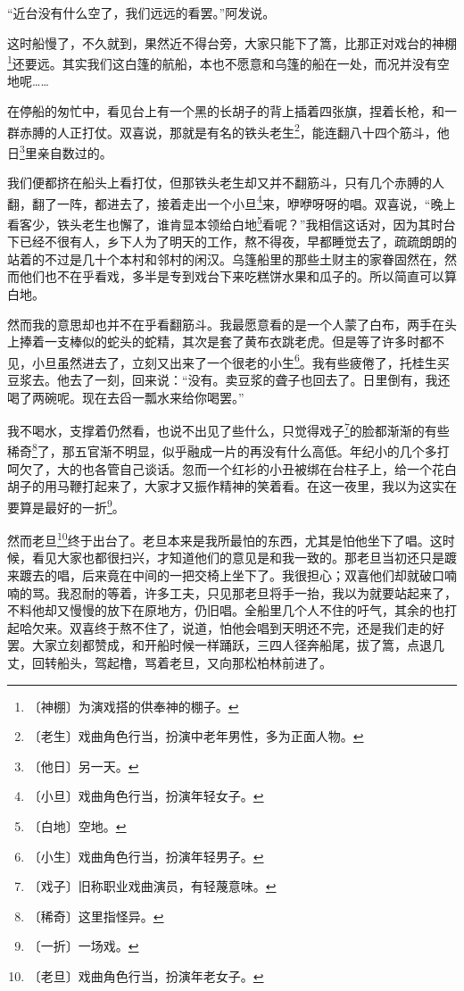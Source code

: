 \documentclass[12pt,UTF-8,openany]{ctexbook}
\begin{document}
\begin{large}
    “近台没有什么空了，我们远远的看罢。”阿发说。
    
    这时船慢了，不久就到，果然近不得台旁，大家只能下了篙，比那正对戏台的神棚\footnote{〔神棚〕为演戏搭的供奉神的棚子。}还要远。其实我们这白篷的航船，本也不愿意和乌篷的船在一处，而况并没有空地呢……
    
    在停船的匆忙中，看见台上有一个黑的长胡子的背上插着四张旗，捏着长枪，和一群赤膊的人正打仗。双喜说，那就是有名的铁头老生\footnote{〔老生〕戏曲角色行当，扮演中老年男性，多为正面人物。}，能连翻八十四个筋斗，他日\footnote{〔他日〕另一天。}里亲自数过的。
    
    我们便都挤在船头上看打仗，但那铁头老生却又并不翻筋斗，只有几个赤膊的人翻，翻了一阵，都进去了，接着走出一个小旦\footnote{〔小旦〕戏曲角色行当，扮演年轻女子。}来，咿咿呀呀的唱。双喜说，“晚上看客少，铁头老生也懈了，谁肯显本领给白地\footnote{〔白地〕空地。}看呢？”我相信这话对，因为其时台下已经不很有人，乡下人为了明天的工作，熬不得夜，早都睡觉去了，疏疏朗朗的站着的不过是几十个本村和邻村的闲汉。乌篷船里的那些土财主的家眷固然在，然而他们也不在乎看戏，多半是专到戏台下来吃糕饼水果和瓜子的。所以简直可以算白地。
    
    然而我的意思却也并不在乎看翻筋斗。我最愿意看的是一个人蒙了白布，两手在头上捧着一支棒似的蛇头的蛇精，其次是套了黄布衣跳老虎。但是等了许多时都不见，小旦虽然进去了，立刻又出来了一个很老的小生\footnote{〔小生〕戏曲角色行当，扮演年轻男子。}。我有些疲倦了，托桂生买豆浆去。他去了一刻，回来说：“没有。卖豆浆的聋子也回去了。日里倒有，我还喝了两碗呢。现在去舀一瓢水来给你喝罢。”
    
    我不喝水，支撑着仍然看，也说不出见了些什么，只觉得戏子\footnote{〔戏子〕旧称职业戏曲演员，有轻蔑意味。}的脸都渐渐的有些稀奇\footnote{〔稀奇〕这里指怪异。}了，那五官渐不明显，似乎融成一片的再没有什么高低。年纪小的几个多打呵欠了，大的也各管自己谈话。忽而一个红衫的小丑被绑在台柱子上，给一个花白胡子的用马鞭打起来了，大家才又振作精神的笑着看。在这一夜里，我以为这实在要算是最好的一折\footnote{〔一折〕一场戏。}。
    
    然而老旦\footnote{〔老旦〕戏曲角色行当，扮演年老女子。}终于出台了。老旦本来是我所最怕的东西，尤其是怕他坐下了唱。这时候，看见大家也都很扫兴，才知道他们的意见是和我一致的。那老旦当初还只是踱来踱去的唱，后来竟在中间的一把交椅上坐下了。我很担心；双喜他们却就破口喃喃的骂。我忍耐的等着，许多工夫，只见那老旦将手一抬，我以为就要站起来了，不料他却又慢慢的放下在原地方，仍旧唱。全船里几个人不住的吁气，其余的也打起哈欠来。双喜终于熬不住了，说道，怕他会唱到天明还不完，还是我们走的好罢。大家立刻都赞成，和开船时候一样踊跃，三四人径奔船尾，拔了篙，点退几丈，回转船头，驾起橹，骂着老旦，又向那松柏林前进了。
    

\end{large}
\end{document}
